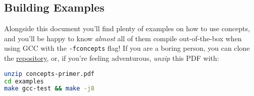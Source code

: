 \subsection*{Building Examples}

Alongside this document you'll find plenty of examples on how to use concepts, and you'll be happy to know \emph{almost} all of them compile out-of-the-box when using GCC with the \texttt{-fconcepts} flag! If you are a boring person, you can clone the \href{https://github.com/CaffeineViking/concepts-primer}{repository}, or, if you're feeling adventurous, \emph{unzip} this PDF with:

\begin{lstlisting}[language=bash, morekeywords={unzip, make},
                                  deletekeywords={test}]
unzip concepts-primer.pdf
cd examples
make gcc-test && make -j8
\end{lstlisting}
